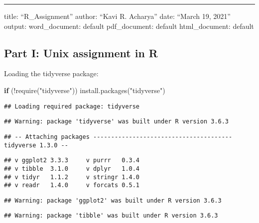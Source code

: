 \documentclass[
]{article}
\author{}
\date{\vspace{-2.5em}}
\newenvironment{Shaded}{\begin{snugshade}}{\end{snugshade}}
\newcommand{\ControlFlowTok}[1]{\textcolor[rgb]{0.13,0.29,0.53}{\textbf{#1}}}
\newcommand{\FunctionTok}[1]{\textcolor[rgb]{0.00,0.00,0.00}{#1}}
\newcommand{\NormalTok}[1]{#1}
\newcommand{\SpecialCharTok}[1]{\textcolor[rgb]{0.00,0.00,0.00}{#1}}
\newcommand{\StringTok}[1]{\textcolor[rgb]{0.31,0.60,0.02}{#1}}
\begin{document}
\begin{center}\rule{0.5\linewidth}{0.5pt}\end{center}

title: ``R\_Assignment'' author: ``Kavi R. Acharya'' date: ``March 19,
2021'' output: word\_document: default pdf\_document: default
html\_document: default

\hypertarget{part-i-unix-assignment-in-r}{%
\subsection{Part I: Unix assignment in
R}\label{part-i-unix-assignment-in-r}}

Loading the tidyverse package:

\begin{Shaded}
\begin{Highlighting}[]
\ControlFlowTok{if}\NormalTok{ (}\SpecialCharTok{!}\FunctionTok{require}\NormalTok{(}\StringTok{"tidyverse"}\NormalTok{)) }\FunctionTok{install.packages}\NormalTok{(}\StringTok{"tidyverse"}\NormalTok{)}
\end{Highlighting}
\end{Shaded}

\begin{verbatim}
## Loading required package: tidyverse
\end{verbatim}

\begin{verbatim}
## Warning: package 'tidyverse' was built under R version 3.6.3
\end{verbatim}

\begin{verbatim}
## -- Attaching packages --------------------------------------- tidyverse 1.3.0 --
\end{verbatim}

\begin{verbatim}
## v ggplot2 3.3.3     v purrr   0.3.4
## v tibble  3.1.0     v dplyr   1.0.4
## v tidyr   1.1.2     v stringr 1.4.0
## v readr   1.4.0     v forcats 0.5.1
\end{verbatim}

\begin{verbatim}
## Warning: package 'ggplot2' was built under R version 3.6.3
\end{verbatim}

\begin{verbatim}
## Warning: package 'tibble' was built under R version 3.6.3
\end{verbatim}
\end{document}
